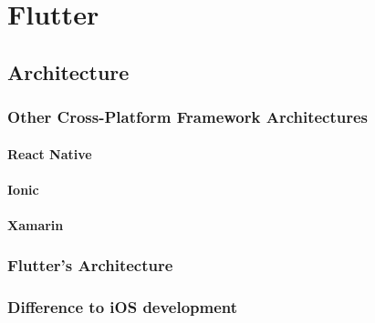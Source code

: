 \chapter{Flutter}

\section{Architecture}

\subsection{Other Cross-Platform Framework Architectures}

\subsubsection{React Native}

\subsubsection{Ionic}

\subsubsection{Xamarin}


\subsection{Flutter's Architecture}

\subsection{Difference to iOS development}